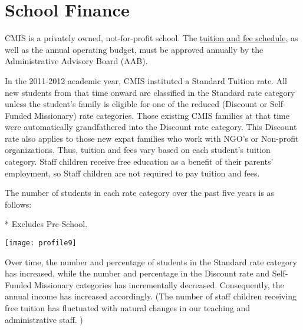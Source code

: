 \section{School Finance}

CMIS is a privately owned, not-for-profit school.  The \href{https://docs.google.com/document/d/1j2Z1tLgRgfX9CH3dzoYtU_GOhPOVWKPl6iFlvWqd6wM/edit?usp=sharing}{tuition and fee schedule}, as well as the annual operating budget, must be approved annually by the Administrative Advisory Board (AAB). 


In the 2011-2012 academic year, CMIS instituted a Standard Tuition rate.  All new students from that time onward are classified in the Standard rate category unless the student’s family is eligible for one of the reduced (Discount or Self-Funded Missionary) rate categories.  Those existing CMIS families at that time were automatically grandfathered into the Discount rate category.  This Discount rate also applies to those new expat families who work with NGO’s or Non-profit organizations.  Thus, tuition and fees vary based on each student’s tuition category.  Staff children receive free education as a benefit of their parents’ employment, so Staff children are not required to pay tuition and fees.  

The number of students in each rate category over the past five years is as follows:

* Excludes Pre-School.  

\texttt{[image: profile9]}

Over time, the number and percentage of students in the Standard rate category has increased, while the number and percentage in the Discount rate and Self-Funded Missionary categories has incrementally decreased.  Consequently, the annual income has increased accordingly.  (The number of staff children receiving free tuition has fluctuated with natural changes in our teaching and administrative staff. )  
 

